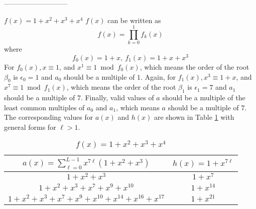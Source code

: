 ---------------------------

\begin{example}
	$f(x)=1+x^2+x^3+x^4$\newline
	$f(x)$ can be written as 
	$$f(x)=\prod_{k=0}^{1}f_k(x)$$
	where 
	$$f_0(x)=1+x,~f_1(x)=1+x+x^3$$ 
	For $f_0(x), x \equiv 1$, and $x^1 \equiv 1 \bmod f_0(x)$, which means the order of the root $\beta_0$ is $\epsilon_0=1$ and $a_0$ should be a multiple of $1$. Again, for  $f_1(x), x^3 \equiv 1+x$, and $x^7 \equiv 1 \bmod f_1(x)$, which means the order of the root $\beta_1$ is $\epsilon_1=7$ and $a_1$ should be a multiple of $7$.
	Finally, valid values of $a$ should be a multiple of the least common multiples of $a_0$ and $a_1$, which means $a$ should be a multiple of $7$.
	The corresponding values for $a(x)$ and $h(x)$ are shown in Table \ref{novelTab1-a} with general forms for $\ell>1$.
	\begin{table}[htbp]
		\renewcommand{\arraystretch}{1.3}
		\caption{$f(x)=1+x^2+x^3+x^4$}
		\centering
		\begin{tabular}{c c } 
			\hline
			$a(x)=\sum_{\ell=0}^{L-1} x^{7\ell}(1+x^2+x^3)$ & $h(x)=1+x^{7\ell}$ \\ [0.5ex] 
			\hline\hline
			$1+x^2+x^3$ & $1+x^7$\\ 
			$1+x^2+x^3+x^7+x^9+x^{10}$ & $1+x^{14}$ \\
			$1+x^2+x^3+x^7+x^9+x^{10}+x^{14}+x^{16}+x^{17}$ & $1+x^{21}$
		\end{tabular}
		\label{novelTab1-a}
	\end{table}
	
\end{example}

